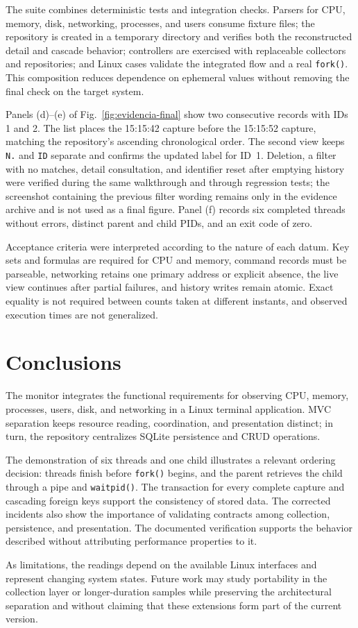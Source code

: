 \documentclass[conference]{IEEEtran}
\begin{document}
The suite combines deterministic tests and integration checks. Parsers for CPU, memory, disk, networking, processes, and users consume fixture files; the repository is created in a temporary directory and verifies both the reconstructed detail and cascade behavior; controllers are exercised with replaceable collectors and repositories; and Linux cases validate the integrated flow and a real \texttt{fork()}. This composition reduces dependence on ephemeral values without removing the final check on the target system.

Panels (d)--(e) of Fig.~\ref{fig:evidencia-final} show two consecutive records with IDs 1 and 2. The list places the 15:15:42 capture before the 15:15:52 capture, matching the repository's ascending chronological order. The second view keeps \texttt{N.} and \texttt{ID} separate and confirms the updated label for ID~1. Deletion, a filter with no matches, detail consultation, and identifier reset after emptying history were verified during the same walkthrough and through regression tests; the screenshot containing the previous filter wording remains only in the evidence archive and is not used as a final figure. Panel (f) records six completed threads without errors, distinct parent and child PIDs, and an exit code of zero.

Acceptance criteria were interpreted according to the nature of each datum. Key sets and formulas are required for CPU and memory, command records must be parseable, networking retains one primary address or explicit absence, the live view continues after partial failures, and history writes remain atomic. Exact equality is not required between counts taken at different instants, and observed execution times are not generalized.

\section{Conclusions}
The monitor integrates the functional requirements for observing CPU, memory, processes, users, disk, and networking in a Linux terminal application. MVC separation keeps resource reading, coordination, and presentation distinct; in turn, the repository centralizes SQLite persistence and CRUD operations.

The demonstration of six threads and one child illustrates a relevant ordering decision: threads finish before \texttt{fork()} begins, and the parent retrieves the child through a pipe and \texttt{waitpid()}. The transaction for every complete capture and cascading foreign keys support the consistency of stored data. The corrected incidents also show the importance of validating contracts among collection, persistence, and presentation. The documented verification supports the behavior described without attributing performance properties to it.

As limitations, the readings depend on the available Linux interfaces and represent changing system states. Future work may study portability in the collection layer or longer-duration samples while preserving the architectural separation and without claiming that these extensions form part of the current version.



\end{document}
